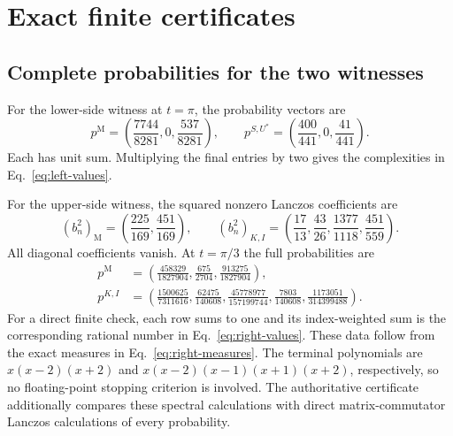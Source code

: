 \section{Exact finite certificates}\label{app:certificates}
\subsection{Complete probabilities for the two witnesses}
For the lower-side witness at $t=\pi$, the probability vectors are
\begin{equation}\label{eq:left-probabilities}
 p^{\mathrm M}=\left(\frac{7744}{8281},0,\frac{537}{8281}\right),
 \qquad
 p^{S,U^*}=\left(\frac{400}{441},0,\frac{41}{441}\right).
\end{equation}
Each has unit sum. Multiplying the final entries by two gives the
complexities in Eq.~\eqref{eq:left-values}.

For the upper-side witness, the squared nonzero Lanczos coefficients are
\begin{equation}\label{eq:right-lanczos}
 (b_n^2)_{\mathrm M}=\left(\frac{225}{169},\frac{451}{169}\right),
 \qquad
 (b_n^2)_{K,I}=\left(\frac{17}{13},\frac{43}{26},
                      \frac{1377}{1118},\frac{451}{559}\right).
\end{equation}
All diagonal coefficients vanish. At $t=\pi/3$ the full probabilities are
\begin{equation}\label{eq:right-probabilities}
 \begin{aligned}
 p^{\mathrm M}&=\left(\frac{458329}{1827904},\frac{675}{2704},
                           \frac{913275}{1827904}\right),\\
 p^{K,I}&=\left(\frac{1500625}{7311616},\frac{62475}{140608},
 \frac{45778977}{157199744},\frac{7803}{140608},\frac{1173051}{314399488}\right).
 \end{aligned}
\end{equation}
For a direct finite check, each row sums to one and its index-weighted
sum is the corresponding rational number in Eq.~\eqref{eq:right-values}.
These data follow from the exact measures in Eq.~\eqref{eq:right-measures}.
The terminal polynomials are $x(x-2)(x+2)$ and
$x(x-2)(x-1)(x+1)(x+2)$, respectively, so no floating-point stopping
criterion is involved. The authoritative certificate additionally compares
these spectral calculations with direct matrix-commutator Lanczos
calculations of every probability.


